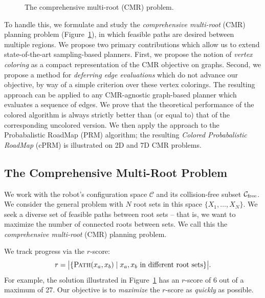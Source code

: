 \begin{figure}
{{
      }
      \label{subfig:cmr-illustration}
   }
   \caption{The comprehensive multi-root (CMR) problem.}
   \label{fig:cmr-problems}
\end{figure}

To handle this,
we formulate and study the
\emph{comprehensive multi-root} (CMR) planning problem
\cite{dellin2015cmr} (Figure~\ref{fig:cmr-problems}),
in which feasible paths are desired between multiple regions.
We propose two primary contributions which allow us to extend
state-of-the-art sampling-based planners.
First, we propose the notion of \emph{vertex coloring} as a compact
representation of the CMR objective on graphs.
Second, we propose a method for \emph{deferring edge evaluations}
which do not advance our objective, by way of a simple
criterion over these vertex colorings.
The resulting approach can be applied to any CMR-agnostic 
graph-based planner which evaluates a sequence of edges.
We prove that the theoretical performance of the colored algorithm
is always strictly better than (or equal to)
that of the corresponding uncolored version.
We then apply the approach to the Probabalistic RoadMap (PRM)
algorithm;
the resulting \emph{Colored Probabalistic RoadMap} (cPRM)
is illustrated on 2D and 7D CMR problems.

\subsection{The Comprehensive Multi-Root Problem}

We work with the robot's configuration space $\mathcal{C}$
and its collision-free subset $\mathcal{C}_{\mbox{\scriptsize free}}$.
We consider the general problem with $N$ root sets in this space
$\{ X_1, \dots, X_N \}$.
We seek a diverse set of feasible paths between root sets
-- that is, we want to maximize the number of connected roots between sets. 
We call this the \emph{comprehensive multi-root} (CMR) planning problem.

We track progress via the $r$-score:
\begin{equation}
   r = \big| \{
      \textsc{Path}(x_a,x_b) \;|\; x_a,x_b~\text{in different root sets}
      \} \big|.
   \label{eqn:obj}
\end{equation}
For example, the solution illustrated in
Figure~\ref{fig:cmr-problems}
has an $r$-score of 6 out of a maximum of 27.
Our objective is to \emph{maximize} the $r$-score as \emph{quickly} as
possible.


